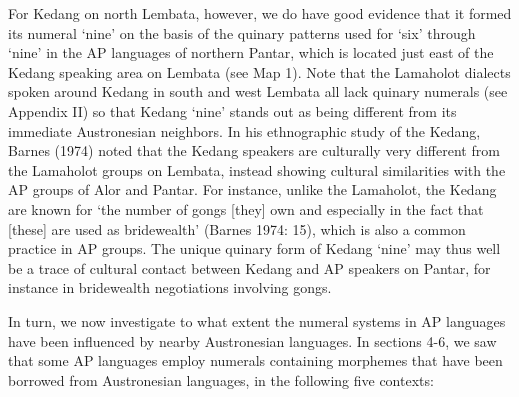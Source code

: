 For Kedang on north Lembata, however, we do have good evidence that it formed its numeral {\textquoteleft}nine{\textquoteright} on the basis of the quinary patterns used for {\textquoteleft}six{\textquoteright} through {\textquoteleft}nine{\textquoteright} in the AP languages of northern Pantar, which is located just east of the Kedang speaking area on Lembata (see Map 1). Note that the Lamaholot dialects spoken around Kedang in south and west Lembata all lack quinary numerals (see Appendix II) so that Kedang {\textquoteleft}nine{\textquoteright} stands out as being different from its immediate Austronesian neighbors. In his ethnographic study of the Kedang, Barnes (1974) noted that the Kedang speakers are culturally very different from the Lamaholot groups on Lembata, instead showing cultural similarities with the AP groups of Alor and Pantar. For instance, unlike the Lamaholot, the Kedang are known for {\textquoteleft}the number of gongs [they] own and especially in the fact that [these] are used as 
bridewealth{\textquoteright} (Barnes 1974: 15), which is also a common practice in AP groups. The unique quinary form of Kedang {\textquoteleft}nine{\textquoteright} may thus well be a trace of cultural contact between Kedang and AP speakers on Pantar, for instance in bridewealth negotiations involving gongs.\textstylefootnotereference{ }

In turn, we now investigate to what extent the numeral systems in AP languages have been influenced by nearby Austronesian languages. In sections 4-6, we saw that some AP languages employ numerals containing morphemes that have been borrowed from Austronesian languages, in the following five contexts: 

